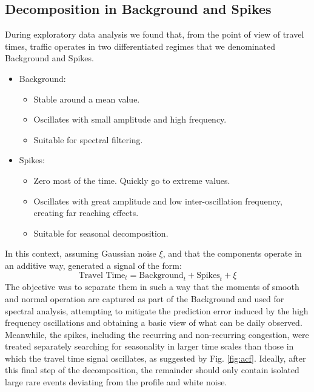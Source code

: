 \documentclass[letterpaper, 10 pt, conference]{ieeeconf}  %
\begin{document}
\subsection{Decomposition in Background and Spikes}
During exploratory data analysis we found that, from the point of view of travel times, traffic operates in two differentiated regimes that we denominated Background and Spikes. 
\begin{itemize}
	\item Background: 
	\begin{itemize}
		\item Stable around a mean value.
		\item Oscillates with small amplitude and high frequency.
		\item Suitable for spectral filtering.
	\end{itemize}
	\item Spikes: 
	\begin{itemize}
		\item Zero most of the time. Quickly go to extreme values.
		\item Oscillates with great amplitude and low inter-oscillation frequency, creating far reaching effects.
		\item Suitable for seasonal decomposition.
	\end{itemize}
\end{itemize}


In this context, assuming Gaussian noise $\xi$, and that the components operate in an additive way, generated a signal of the form:
\begin{equation}
\textrm{Travel Time}_t  = \textrm{Background}_t + \textrm{Spikes}_t + \xi
\end{equation}
The objective was to separate them in such a way that the moments of smooth and normal operation are captured as part of the Background and used for spectral analysis, attempting to mitigate the prediction error induced by the high frequency oscillations and obtaining a basic view of what can be daily observed.
Meanwhile, the spikes, including the recurring and non-recurring congestion, were treated separately searching for seasonality in larger time scales than those in which the travel time signal oscillates, as suggested by Fig. \ref{fig:acf}. 
Ideally, after this final step of the decomposition, the remainder should only contain isolated large rare events deviating from the profile and white noise.\\
\end{document}
